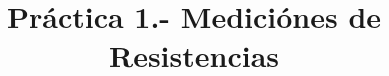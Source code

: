 \documentclass[11pt,a4paper]{report}
\begin{document}
	
	
	\title{Pr\'actica 1.- Medici\'ones de Resistencias}
	\maketitle
\end{document}
